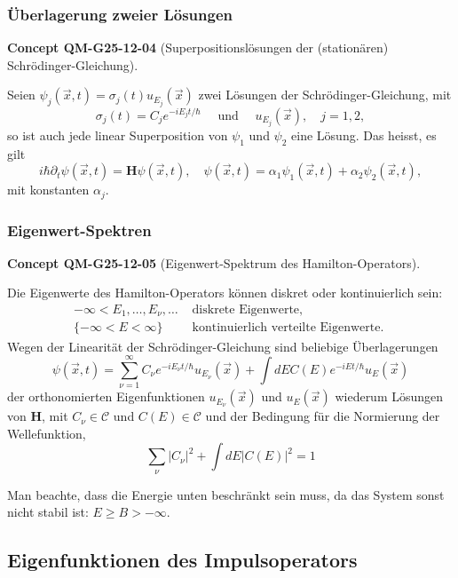 \documentclass[10pt, letterpaper]{article}
\newcommand{\CustomHeading}[3]{%
  \par\medskip\noindent%
  \textbf{#1 #2} \textnormal{(#3)}.\enskip%
}
\newenvironment{CONC}[2]{\begin{unitbox}\CustomHeading{Concept}{#1}{#2}}{\end{unitbox}}
\begin{document}
\subsubsection*{Überlagerung zweier Lösungen}


\begin{CONC}{QM-G25-12-04}{Superpositionslösungen der (stationären) Schrödinger-Gleichung}
Seien $\psi_{j}(\vec{x}, t)=\sigma_{j}(t) u_{E_{j}}(\vec{x})$ zwei Lösungen der Schrödinger-Gleichung, mit
$$
\sigma_{j}(t)=C_{j} e^{-i E_{j} t / \hbar} \quad \text { und } \quad u_{E_{j}}(\vec{x}), \quad j=1,2,
$$
so ist auch jede linear Superposition von $\psi_{1}$ und $\psi_{2}$ eine Lösung. Das heisst, es gilt
$$
i \hbar \partial_{t} \psi(\vec{x}, t)=\mathbf{H} \psi(\vec{x}, t), \quad \psi(\vec{x}, t)=\alpha_{1} \psi_{1}(\vec{x}, t)+\alpha_{2} \psi_{2}(\vec{x}, t),
$$
mit konstanten $\alpha_{j}$.
\end{CONC}


\subsubsection*{Eigenwert-Spektren}


\begin{CONC}{QM-G25-12-05}{Eigenwert-Spektrum des Hamilton-Operators}
Die Eigenwerte des Hamilton-Operators können diskret oder kontinuierlich sein:
$$
\begin{aligned}
-\infty<E_{1}, \ldots, E_{\nu}, \ldots & \text { diskrete Eigenwerte, } \\
\{-\infty<E<\infty\} & \text { kontinuierlich verteilte Eigenwerte. }
\end{aligned}
$$
Wegen der Linearität der Schrödinger-Gleichung sind beliebige Überlagerungen
$$
\psi(\vec{x}, t)=\sum_{\nu=1}^{\infty} C_{\nu} e^{-i E_{\nu} t / \hbar} u_{E_{\nu}}(\vec{x})+\int d E C(E) e^{-i E t / \hbar} u_{E}(\vec{x})
$$
der orthonomierten Eigenfunktionen $u_{E_{\nu}}(\vec{x})$ und $u_{E}(\vec{x})$ wiederum Lösungen von $\mathbf{H}$, mit $C_{\nu} \in \mathcal{C}$ und $C(E) \in \mathcal{C}$ und der Bedingung für die Normierung der Wellefunktion,
$$
\sum_{\nu}\left|C_{\nu}\right|^{2}+\int d E|C(E)|^{2}=1
$$

Man beachte, dass die Energie unten beschränkt sein muss, da das System sonst nicht stabil ist: $E \geq B>-\infty$.
\end{CONC}



\subsection*{Eigenfunktionen des Impulsoperators}
\end{document}
